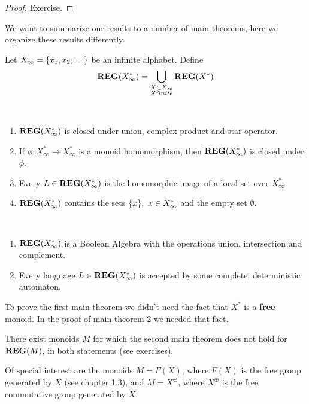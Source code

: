 \begin{proof}
Exercise.
\end{proof}

\bigskip
We want to summarize our results to a number of main theorems, here we organize
these results differently.

Let $X_\infty = \mbox{$\{x_1, x_2, \ldots\}$}$ be an infinite alphabet. Define 
\[ \mbox{{\bf REG}}(X_\infty^*) = \bigcup_{\substack{X \subset X_\infty\\X\text finite}}
\mbox{{\bf REG}}(X^*) \]

\bigskip
\begin{maintheorem}\ 

\begin{enumerate}
  \item $\mbox{{\bf REG}}(X_\infty^*)$ is closed under union, complex product and
  star-operator.
  \item If $\phi : X_\infty^* \to X_\infty^*$ is a monoid homomorphism, then
$\mbox{{\bf REG}}(X_\infty^*)$ is closed under $\phi$.
	\item Every $L \in \mbox{{\bf REG}}(X_\infty^*)$ is the homomorphic image of a local set
	over $X_\infty^*$.
	\item $\mbox{{\bf REG}}(X_\infty^*)$	 contains the sets $\mbox{$\{x\}$},\ x \in X_\infty^*$
	and the empty set $\emptyset$.
\end{enumerate}
\end{maintheorem}

\bigskip
\begin{maintheorem}\ 

\begin{enumerate}
  \item $\mbox{{\bf REG}}(X_\infty^*)$ is a Boolean Algebra with the operations union, 
  intersection and complement.
	\item Every language $L \in \mbox{{\bf REG}}(X_\infty^*)$ is accepted by some complete,
deterministic automaton.
\end{enumerate}
\end{maintheorem}

To prove the first main theorem we didn't need the fact that $X^*$ is a {\bf
free} monoid. In the proof of main theorem 2 we needed that fact.

There exist monoids $M$ for which the second main theorem does not
hold for $\mbox{{\bf REG}}(M)$, in both statements (see exercises).

Of special interest are the monoids $M = F(X)$, where $F(X)$ is the free group
generated by $X$ (see chapter 1.3), and $M = X^\oplus$, where $X^\oplus$ is the
free commutative group generated by $X$.

